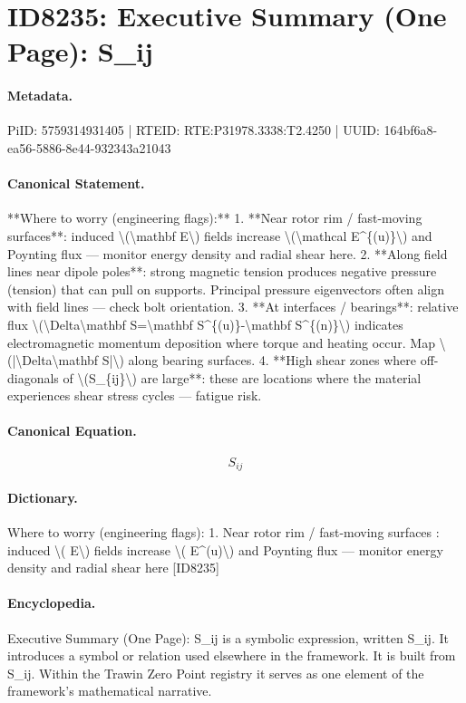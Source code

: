 \section*{ID8235: Executive Summary (One Page): S\_ij}
\paragraph{Metadata.}
PiID: 5759314931405 | RTEID: RTE:P31978.3338:T2.4250 | UUID: 164bf6a8-ea56-5886-8e44-932343a21043

\paragraph{Canonical Statement.}
**Where to worry (engineering flags):** 1. **Near rotor rim / fast-moving surfaces**: induced \textbackslash{}(\textbackslash{}mathbf E\textbackslash{}) fields increase \textbackslash{}(\textbackslash{}mathcal E\textasciicircum{}\{(u)\}\textbackslash{}) and Poynting flux — monitor energy density and radial shear here. 2. **Along field lines near dipole poles**: strong magnetic tension produces negative pressure (tension) that can pull on supports. Principal pressure eigenvectors often align with field lines — check bolt orientation. 3. **At interfaces / bearings**: relative flux \textbackslash{}(\textbackslash{}Delta\textbackslash{}mathbf S=\textbackslash{}mathbf S\textasciicircum{}\{(u)\}-\textbackslash{}mathbf S\textasciicircum{}\{(n)\}\textbackslash{}) indicates electromagnetic momentum deposition where torque and heating occur. Map \textbackslash{}(|\textbackslash{}Delta\textbackslash{}mathbf S|\textbackslash{}) along bearing surfaces. 4. **High shear zones where off-diagonals of \textbackslash{}(S\_\{ij\}\textbackslash{}) are large**: these are locations where the material experiences shear stress cycles — fatigue risk.

\paragraph{Canonical Equation.}
\[
S_{ij}
\]

\paragraph{Dictionary.}
Where to worry (engineering flags): 1. Near rotor rim / fast-moving surfaces : induced \textbackslash{}( E\textbackslash{}) fields increase \textbackslash{}( E\textasciicircum{}(u)\textbackslash{}) and Poynting flux — monitor energy density and radial shear here [ID8235]

\paragraph{Encyclopedia.}
Executive Summary (One Page): S\_ij is a symbolic expression, written S\_ij. It introduces a symbol or relation used elsewhere in the framework. It is built from S\_ij. Within the Trawin Zero Point registry it serves as one element of the framework's mathematical narrative.
